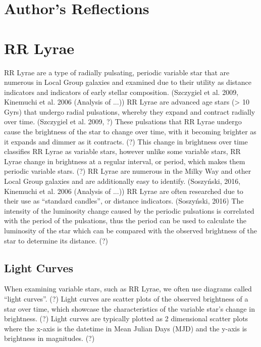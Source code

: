 \documentclass[]{article}
\begin{document}
\newpage

\section{Author's Reflections}

\newpage

\section{RR Lyrae}

RR Lyrae are a type of radially pulsating, periodic variable star that are numerous in Local Group galaxies and examined due to their utility as distance indicators and indicators of early stellar composition. (Szczygiel et al. 2009, Kinemuchi et al. 2006 (Analysis of ...)) RR Lyrae are advanced age stars (> 10 Gyrs) that undergo radial pulsations, whereby they expand and contract radially over time. (Szczygiel et al. 2009, ?) These pulsations that RR Lyrae undergo cause the brightness of the star to change over time, with it becoming brighter as it expands and dimmer as it contracts. (?) This change in brightness over time classifies RR Lyrae as variable stars, however unlike some variable stars, RR Lyrae change in brightness at a regular interval, or period, which makes them periodic variable stars. (?) RR Lyrae are numerous in the Milky Way and other Local Group galaxies and are additionally easy to identify. (Soszyński, 2016, Kinemuchi et al. 2006 (Analysis of ...)) RR Lyrae are often researched due to their use as “standard candles”, or distance indicators.\cite{2016AcA....66..131S} (Soszyński, 2016) The intensity of the luminosity change caused by the periodic pulsations is correlated with the period of the pulsations, thus the period can be used to calculate the luminosity of the star which can be compared with the observed brightness of the star to determine its distance. (?)

\subsection{Light Curves}

When examining variable stars, such as RR Lyrae, we often use diagrams called “light curves”. (?) Light curves are scatter plots of the observed brightness of a star over time, which showcase the characteristics of the variable star’s change in brightness. (?) Light curves are typically plotted as 2 dimensional scatter plots where the x-axis is the datetime in Mean Julian Days (MJD) and the y-axis is brightness in magnitudes. (?)
\end{document}
